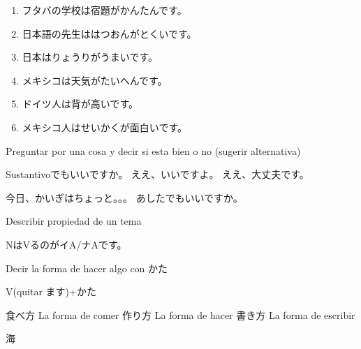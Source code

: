 
\begin{enumerate}
  \item フタバの学校は宿題がかんたんです。
  \item 日本語の先生ははつおんがとくいです。
  \item 日本はりょうりがうまいです。
  \item メキシコは天気がたいへんです。
  \item ドイツ人は背が高いです。
  \item メキシコ人はせいかくが面白いです。
\end{enumerate}

Preguntar por una cosa y decir si esta bien o no (sugerir alternativa)

Sustantivoでもいいですか。
ええ、いいですよ。
ええ、大丈夫です。

今日、かいぎはちょっと。。。
あしたでもいいですか。

Describir propiedad de un tema

NはVるのがイA/ナAです。

Decir la forma de hacer algo con かた

V(quitar ます)+かた

食べ方 La forma de comer
作り方 La forma de hacer
書き方 La forma de escribir

海
